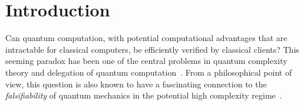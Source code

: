\section{Introduction}

Can quantum computation, with potential computational advantages that are intractable for classical computers,
be efficiently verified by classical clients?
This seeming paradox has been one of the central problems in quantum complexity theory and delegation of quantum computation~\cite{web:Aaronson}.
From a philosophical point of view, this question is also known to have a fascinating connection to the \emph{falsifiability} of quantum mechanics in the potential high complexity regime~\cite{survey:AV12}.

